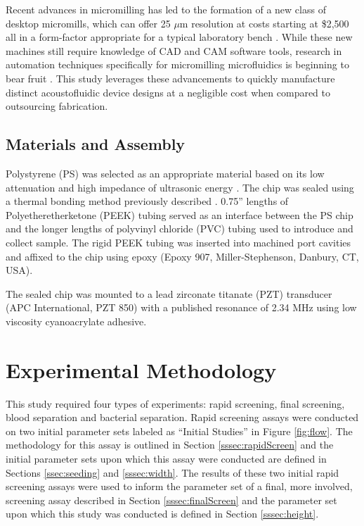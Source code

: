 Recent advances in micromilling has led to the formation of a new class of desktop micromills, which can offer 25 $\mu$m resolution at costs starting at \$2,500 all in a form-factor appropriate for a typical laboratory bench \cite{yen2016cost}. While these new machines still require knowledge of CAD and CAM software tools, research in automation techniques specifically for micromilling microfluidics is beginning to bear fruit \cite{silva2016iwbda}. This study leverages these advancements to quickly manufacture distinct acoustofluidic device designs at a negligible cost when compared to outsourcing fabrication.

\subsection{Materials and Assembly}
Polystyrene (PS) was selected as an appropriate material based on its low attenuation and high impedance of ultrasonic energy \cite{wang2001high}. The chip was sealed using a thermal bonding method previously described \cite{mueller2013continuous}. 0.75'' lengths of Polyetheretherketone (PEEK) tubing served as an interface between the PS chip and the longer lengths of polyvinyl chloride (PVC) tubing used to introduce and collect sample. The rigid PEEK tubing was inserted into machined port cavities and affixed to the chip using epoxy (Epoxy 907, Miller-Stephenson, Danbury, CT, USA). 

The sealed chip was mounted to a lead zirconate titanate (PZT) transducer (APC International, PZT 850) with a published resonance of 2.34 MHz using low viscosity cyanoacrylate adhesive.  


\section{Experimental Methodology}
\label{sec:experiment}
This study required four types of experiments: rapid screening, final screening, blood separation and bacterial separation. Rapid screening assays were conducted on two initial parameter sets labeled as ``Initial Studies'' in Figure \ref{fig:flow}. The methodology for this assay is outlined in Section \ref{sssec:rapidScreen} and the initial parameter sets upon which this assay were conducted are defined in Sections \ref{ssec:seeding} and \ref{sssec:width}. The results of these two initial rapid screening assays were used to inform the parameter set of a final, more involved, screening assay described in Section \ref{sssec:finalScreen} and the parameter set upon which this study was conducted is defined in Section \ref{sssec:height}. 

